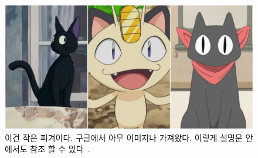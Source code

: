 \begin{figure}[H]
\includegraphics[width=\linewidth]{images/cats.jpg}
\caption{이건 작은 피겨이다. 구글에서 아무 이미지나 가져왔다. 이렇게 설명문 안에서도 참조 할 수 있다~\cite{texbook}.}
\label{fig:small}
\centering
\end{figure}